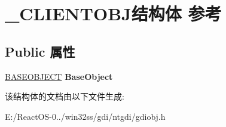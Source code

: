\hypertarget{struct___c_l_i_e_n_t_o_b_j}{}\section{\+\_\+\+C\+L\+I\+E\+N\+T\+O\+B\+J结构体 参考}
\label{struct___c_l_i_e_n_t_o_b_j}
\subsection*{Public 属性}
\begin{DoxyCompactItemize}
\item 
\mbox{\label{struct___c_l_i_e_n_t_o_b_j_a82ceb68aaa15addc976af274646ce065}} 
\hyperlink{class_b_a_s_e_o_b_j_e_c_t}{B\+A\+S\+E\+O\+B\+J\+E\+CT} {\bfseries Base\+Object}
\end{DoxyCompactItemize}


该结构体的文档由以下文件生成\+:\begin{DoxyCompactItemize}
\item 
E\+:/\+React\+O\+S-\/0../win32ss/gdi/ntgdi/gdiobj.\+h\end{DoxyCompactItemize}
